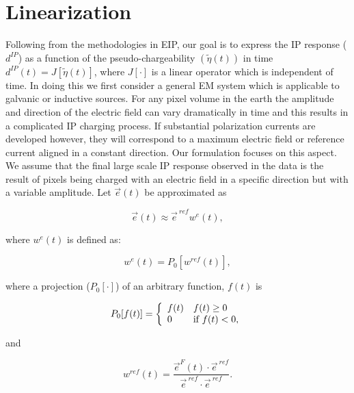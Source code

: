 \documentclass[extra,mreferee]{gji}
\newcommand {\e}  { {\vec e} }
\newcommand{\peta}{\tilde{\eta}}
\newcommand{\eref}{\e^{\ ref}}
\newcommand{\dip}{d^{IP}}
\begin{document}
\section{Linearization}
Following from the methodologies in EIP, our goal is to express the IP response ($\dip$) as a function of the pseudo-chargeability $(\peta(t))$ in time  $\dip(t) = J[\peta(t)]$, where $J[\cdot]$ is a linear operator which is independent of time. In doing this we first consider a general EM system which is applicable to galvanic or inductive sources. 
For any pixel  volume in the earth the amplitude and direction of the  electric field can vary dramatically  in time and this results in a complicated  IP charging process. If substantial polarization currents are developed however, they will correspond to a maximum electric field or reference current aligned in a constant direction. Our formulation focuses on this aspect. We assume that the final large scale IP response observed in the data is the result of  pixels being charged with an electric field in a specific direction but with a variable amplitude. Let $\e(t)$ be approximated as
\begin{linenomath*}
\begin{equation}
  \e(t) \approx \eref w^e(t),
  \label{eq: e_with_eref}
\end{equation}
\end{linenomath*}
where $w^e(t)$ is defined as:
\begin{linenomath*}
\begin{equation}
  w^e(t) = P_0[w^{ref}(t)],
  \label{eq: we}
\end{equation}
\end{linenomath*}
where a projection ($P_0[\cdot]$) of an arbitrary function, $f(t)$ is
\begin{linenomath*}
\begin{equation}
  P_0[f(t)] = \left\{ 
  \begin{array}{l l}
    f(t) & f(t) \ge 0 \\
    0 & \text{if } f(t) < 0, 
  \end{array}\right.
  \label{eq: P0}
\end{equation}
\end{linenomath*}
and
\begin{linenomath*}
\begin{equation}
  w^{ref}(t) = \frac{\e^F(t)\cdot\eref}{\eref\cdot\eref}.
  \label{eq: wref}
\end{equation}
\end{linenomath*}
\end{document}
